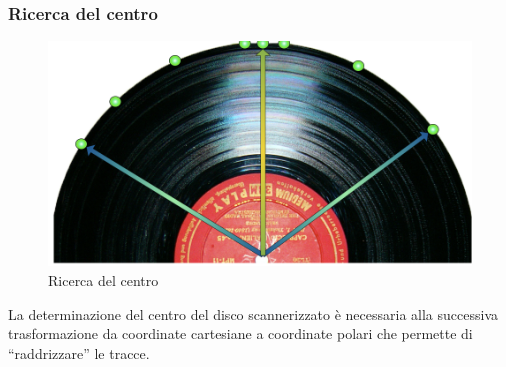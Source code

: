 \subsubsection{Ricerca del centro}
\begin{figure}[h!t]
\begin{center}
\includegraphics[scale=0.15]{./img/center.png}
\caption{Ricerca del centro}
\end{center}
\end{figure}
La determinazione del centro del disco scannerizzato \`e necessaria alla successiva trasformazione da coordinate cartesiane a coordinate polari che permette di ``raddrizzare'' le tracce.

